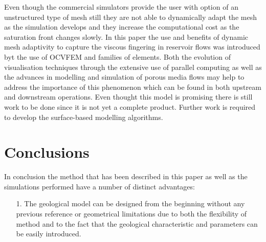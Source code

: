 \documentclass[preprint,authoryear,12pt]{elsarticle}
\begin{document}
{Even though the commercial simulators provide the user with option of an unstructured type of mesh still they are not able to dynamically adapt the mesh as the simulation develops and they increase the computational cost as the saturation front changes slowly. In this paper the use and benefits of dynamic mesh adaptivity to capture the viscous fingering in reservoir flows was introduced byt the use of OCVFEM and families of elements. Both the evolution of visualisation techniques through the extensive use of parallel computing as well as the advances in modelling and simulation of porous media flows may help to address the importance of this phenomenon which can be found in both upstream and downstream operations. Even thought this model is promising there is still work to be done since it is not yet a complete product. Further work is required to develop the surface-based modelling algorithms.


\section{Conclusions}

In conclusion the method that has been described in this paper as well as the simulations performed have a number of distinct advantages: 
\begin{enumerate}
\item[1.] The geological model can be designed from the beginning without any previous reference or geometrical limitations due to both the flexibility of method and to the fact that the geological characteristic and parameters can be easily introduced.


\end{enumerate}}
\end{document}
